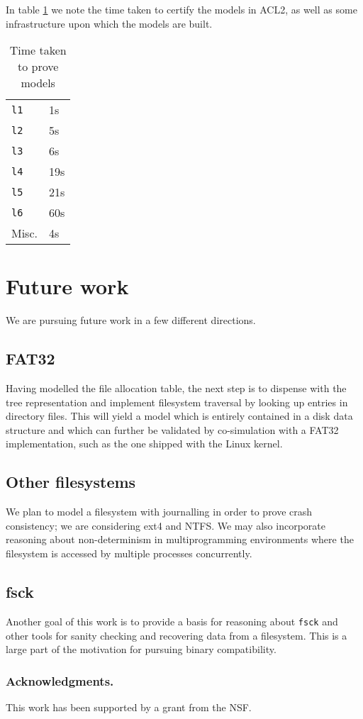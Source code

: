 \documentclass[runningheads,a4paper]{llncs}
\begin{document}
In table \ref{certification-timing-table} we note the time taken to certify
the models in ACL2, as well as some infrastructure upon which the
models are built.

\begin{table}[]
  \centering
  \caption{Time taken to prove models}
  \label{certification-timing-table}
  \begin{tabular}{ll}
    \texttt{l1} & 1s \\
    \texttt{l2} & 5s \\
    \texttt{l3} & 6s \\
    \texttt{l4} & 19s \\
    \texttt{l5} & 21s \\
    \texttt{l6} & 60s \\
    Misc. & 4s \\
  \end{tabular}
\end{table}

\section{Future work}

We are pursuing future work in a few different directions.

\subsection{FAT32}

Having modelled the file allocation table, the next step is to
dispense with the tree representation and implement filesystem
traversal by looking up entries in directory files. This will yield a
model which is entirely contained in a disk data structure and which
can further be validated by co-simulation with a FAT32 implementation,
such as the one shipped with the Linux kernel.

\subsection{Other filesystems}

We plan to model a filesystem with journalling in order to prove crash
consistency; we are considering ext4 and NTFS. We may also incorporate
reasoning about non-determinism in multiprogramming environments where
the filesystem is accessed by multiple processes concurrently.

\subsection{fsck}
Another goal of this work is to provide a basis for reasoning about
\texttt{fsck} and other tools for sanity checking and recovering data
from a filesystem. This is a large part of the motivation for pursuing
binary compatibility.

\subsubsection*{Acknowledgments.} This work has been supported by a
grant from the NSF.



\end{document}
